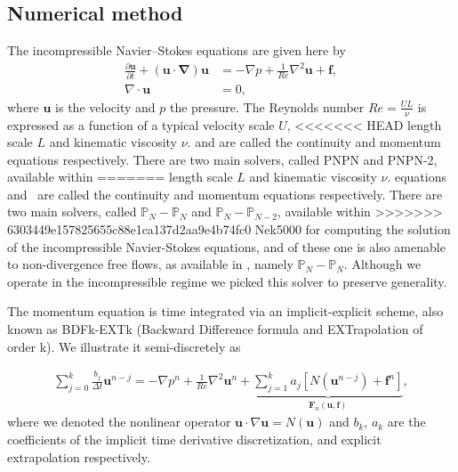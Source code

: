 \documentclass{sig-alternate}
\begin{document}
\subsection{Numerical method}
\label{sec:method}
The incompressible Navier--Stokes equations are given here by
\begin{align} 
 \frac{\partial \mathbf{u}}{\partial t} + (\mathbf{u \cdot \nabla}) \mathbf{u} & = - \nabla p + \frac{1}{Re} \nabla^2 \mathbf{u} + \mathbf{f} \label{eqn:NS_momentum},\\
 \nabla \cdot \mathbf{u} & = 0, \label{eqn:NS_continuity}
\end{align}
where $\mathbf{u}$ is the velocity and $p$ the pressure. The Reynolds number 
$Re = \frac{U L}{\nu}$ is expressed as a function of a typical velocity scale $U$,
<<<<<<< HEAD
length scale $L$ and kinematic viscosity $\nu$.  
and  are called the continuity and momentum equations 
respectively. There are two main solvers, called PNPN and PNPN-2, available within 
=======
length scale $L$ and kinematic viscosity $\nu$. equations~ 
and~ are called the continuity and momentum equations 
respectively. There are two main solvers, called $\mathbb{P}_N-\mathbb{P}_N$ and $\mathbb{P}_N-\mathbb{P}_{N-2}$, available within 
>>>>>>> 6303449e157825655c88e1ca137d2aa9e4b74fc0
Nek5000 for computing the solution of the incompressible 
Navier-Stokes equations, and of these one is also amenable to non-divergence free 
flows, as available in \cite{Tomboulides1997}, namely $\mathbb{P}_N-\mathbb{P}_N$. Although we operate in the incompressible
regime we picked this solver to preserve generality. 

The momentum equation is time integrated via an implicit-explicit scheme, also
known as BDFk-EXTk (Backward Difference formula and EXTrapolation of order k). We
illustrate it semi-discretely as

\begin{eqnarray}
\sum\limits_{j=0}^k \frac{b_j}{\Delta t} \mathbf u^{n-j}  = - \nabla p^{n}+\frac{1}{Re}\nabla^2\mathbf u^{n}+\underbrace{\sum\limits_{j=1}^k a_j [N(\mathbf u^{n-j})+\mathbf f^{n}]}_{\mathbf{F}_n(\mathbf u,\mathbf f)},\label{eqn:discrete}
\end{eqnarray}
where we denoted the nonlinear operator $\mathbf u \cdot \nabla \mathbf u=N(\mathbf u)$ and $b_k$, $a_k$ are the coefficients of the implicit time derivative discretization, and explicit extrapolation respectively.
\end{document}
